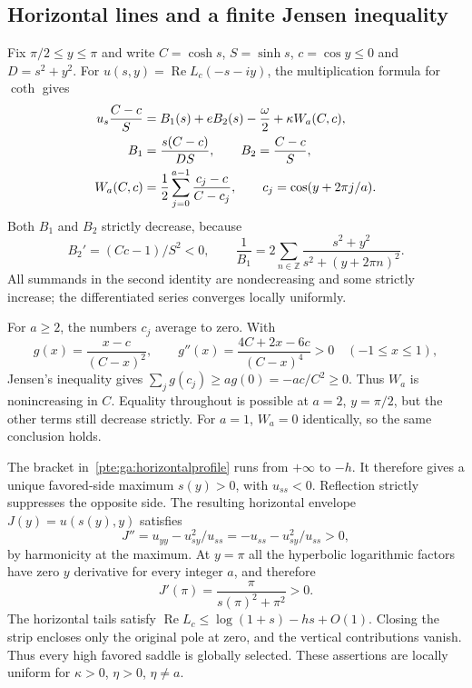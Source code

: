 \documentclass[11pt,a4paper]{article}
\numberwithin{equation}{section}
\theoremstyle{definition}
\theoremstyle{plain}
\begin{document}
\subsection{Horizontal lines and a finite Jensen inequality}
Fix $\pi/2\le y\le\pi$ and write $C=\cosh s$, $S=\sinh s$, $c=\cos y\le0$ and $D=s^2+y^2$. For $u(s,y)=\operatorname{Re}L_c(-s-iy)$, the multiplication formula for $\coth$ gives
\begin{align}
 u_s\frac{C-c}{S}&=B_1(s)+eB_2(s)-\frac\omega2+\kappa W_a(C,c),\label{pte:ga:horizontalprofile}\\
 B_1&=\frac{s(C-c)}{DS},\qquad B_2=\frac{C-c}{S},\notag\\
 W_a(C,c)&=\frac12\sum_{j=0}^{a-1}\frac{c_j-c}{C-c_j},\qquad
 c_j=\cos(y+2\pi j/a).\notag
\end{align}
Both $B_1$ and $B_2$ strictly decrease, because
\[
 B_2'=(C c-1)/S^2<0,\qquad
 \frac1{B_1}=2\sum_{n\in\mathbb Z}
 \frac{s^2+y^2}{s^2+(y+2\pi n)^2}.
\]
All summands in the second identity are nondecreasing and some strictly increase; the differentiated series converges locally uniformly.

For $a\ge2$, the numbers $c_j$ average to zero. With
\[
 g(x)=\frac{x-c}{(C-x)^2},\qquad
 g''(x)=\frac{4C+2x-6c}{(C-x)^4}>0\quad(-1\le x\le1),
\]
Jensen's inequality gives $\sum_jg(c_j)\ge ag(0)=-ac/C^2\ge0$. Thus $W_a$ is nonincreasing in $C$. Equality throughout is possible at $a=2$, $y=\pi/2$, but the other terms still decrease strictly. For $a=1$, $W_a=0$ identically, so the same conclusion holds.

The bracket in~\eqref{pte:ga:horizontalprofile} runs from $+\infty$ to $-h$. It therefore gives a unique favored-side maximum $s(y)>0$, with $u_{ss}<0$. Reflection strictly suppresses the opposite side. The resulting horizontal envelope $J(y)=u(s(y),y)$ satisfies
\begin{equation}\label{pte:ga:horizontalconvex}
 J''=u_{yy}-u_{sy}^2/u_{ss}
     =-u_{ss}-u_{sy}^2/u_{ss}>0,
\end{equation}
by harmonicity at the maximum. At $y=\pi$ all the hyperbolic logarithmic factors have zero $y$ derivative for every integer $a$, and therefore
\begin{equation}\label{pte:ga:endpoint}
 J'(\pi)=\frac{\pi}{s(\pi)^2+\pi^2}>0.
\end{equation}
The horizontal tails satisfy $\operatorname{Re}L_c\le\log(1+s)-hs+O(1)$. Closing the strip encloses only the original pole at zero, and the vertical contributions vanish. Thus every high favored saddle is globally selected. These assertions are locally uniform for $\kappa>0$, $\eta>0$, $\eta\ne a$.
\end{document}
